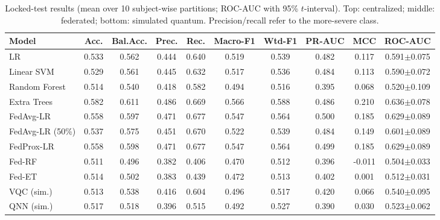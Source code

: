 \begin{table}[!t]\centering\caption{Locked-test results (mean over 10 subject-wise partitions; ROC-AUC with 95\% $t$-interval). Top: centralized; middle: federated; bottom: simulated quantum. Precision/recall refer to the more-severe class.}\label{tab:all}\scriptsize\setlength{\tabcolsep}{4pt}\begin{tabular}{lccccccccc}\toprule Model & Acc. & Bal.Acc. & Prec. & Rec. & Macro-F1 & Wtd-F1 & PR-AUC & MCC & ROC-AUC\\\midrule
LR & 0.533 & 0.562 & 0.444 & 0.640 & 0.519 & 0.539 & 0.482 & 0.117 & 0.591$\pm$0.075\\
Linear SVM & 0.529 & 0.561 & 0.445 & 0.632 & 0.517 & 0.536 & 0.484 & 0.113 & 0.590$\pm$0.072\\
Random Forest & 0.514 & 0.540 & 0.418 & 0.582 & 0.494 & 0.516 & 0.395 & 0.068 & 0.520$\pm$0.109\\
Extra Trees & 0.582 & 0.611 & 0.486 & 0.669 & 0.566 & 0.588 & 0.486 & 0.210 & 0.636$\pm$0.078\\
\midrule
FedAvg-LR & 0.558 & 0.597 & 0.471 & 0.677 & 0.547 & 0.564 & 0.500 & 0.185 & 0.629$\pm$0.089\\
FedAvg-LR (50\%) & 0.537 & 0.575 & 0.451 & 0.670 & 0.522 & 0.539 & 0.484 & 0.149 & 0.601$\pm$0.089\\
FedProx-LR & 0.558 & 0.598 & 0.471 & 0.677 & 0.547 & 0.564 & 0.499 & 0.185 & 0.629$\pm$0.089\\
Fed-RF & 0.511 & 0.496 & 0.382 & 0.406 & 0.470 & 0.512 & 0.396 & -0.011 & 0.504$\pm$0.033\\
Fed-ET & 0.514 & 0.502 & 0.383 & 0.439 & 0.472 & 0.513 & 0.402 & 0.001 & 0.512$\pm$0.031\\
\midrule
VQC (sim.) & 0.513 & 0.538 & 0.416 & 0.604 & 0.496 & 0.517 & 0.420 & 0.066 & 0.540$\pm$0.095\\
QNN (sim.) & 0.517 & 0.518 & 0.396 & 0.515 & 0.492 & 0.527 & 0.390 & 0.030 & 0.523$\pm$0.062\\
\bottomrule\end{tabular}\end{table}
